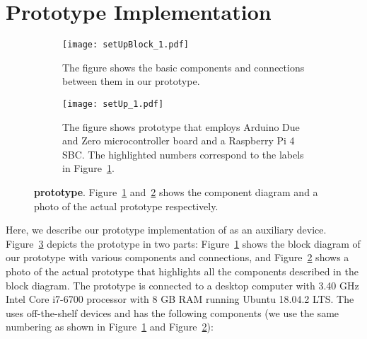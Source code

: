 \section{\name Prototype Implementation}
\label{sec:prototype}


\begin{figure}[t]
    \begin{center}
        \begin{subfigure}{0.4\textwidth}
        \centering
            \texttt{[image: setUpBlock\_1.pdf]}
            \caption{The figure shows the basic components and connections between them in our \name prototype.}
            \label{fig:prototypeArch}    
        \end{subfigure}
    \end{center}
    
    
    \begin{center}
        \begin{subfigure}{0.4\textwidth}
        \centering
        \texttt{[image: setUp\_1.pdf]}
        \caption{The figure shows \name prototype that employs Arduino Due and Zero microcontroller board and a Raspberry Pi 4 SBC. The highlighted numbers correspond to the labels in Figure~\ref{fig:prototypeArch}.}
        \label{fig:prototype}
    \end{subfigure}
    \end{center}
    \vspace{-1em}
    
    \caption{\textbf{\name prototype}. Figure~\ref{fig:prototypeArch} and~\ref{fig:prototype} shows the component diagram and a photo of the actual \name prototype respectively.} 
    \label{fig:prototypeAll}
    \spacesave
\end{figure}

 Here, we describe our prototype implementation of \name as an auxiliary device. Figure~\ref{fig:prototypeAll} depicts the \name prototype in two parts: Figure~\ref{fig:prototypeArch} shows the block diagram of our prototype with various components and connections, and Figure~\ref{fig:prototype} shows a photo of the actual prototype that highlights all the components described in the block diagram. The prototype \device is connected to a desktop computer with 3.40 GHz Intel Core i7-6700 processor with 8 GB RAM running Ubuntu 18.04.2 LTS. The \device uses off-the-shelf devices and has the following components (we use the same numbering as shown in Figure~\ref{fig:prototypeArch} and  Figure~\ref{fig:prototype}):

